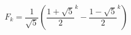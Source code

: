\documentclass[preview]{standalone}
\begin{document}
\begin{center}
$$F_k = \frac{1}{\sqrt{5}} \left( \frac{1 + \sqrt{5}}{2}^k - \frac{1 - \sqrt{5}}{2}^k \right)$$
\end{center}
\end{document}
